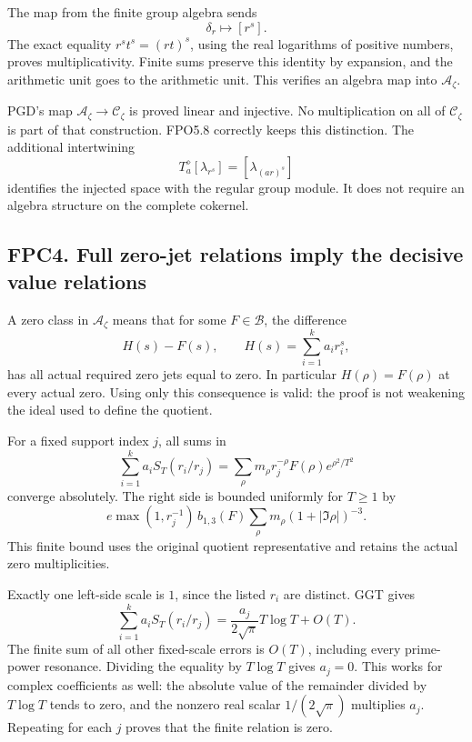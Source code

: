 The map from the finite group algebra sends \[
\delta_r\mapsto[r^s].
\] The exact equality \(r^st^s=(rt)^s\), using the real logarithms of
positive numbers, proves multiplicativity. Finite sums preserve this
identity by expansion, and the arithmetic unit goes to the arithmetic
unit. This verifies an algebra map into \(\mathcal A_\zeta\).

PGD's map \(\mathcal A_\zeta\to\mathcal C_\zeta\) is proved linear and
injective. No multiplication on all of \(\mathcal C_\zeta\) is part of
that construction. FPO5.8 correctly keeps this distinction. The
additional intertwining \[
T_a^\diamond[\lambda_{r^s}]=[\lambda_{(ar)^s}]
\] identifies the injected space with the regular group module. It does
not require an algebra structure on the complete cokernel.

\subsection{FPC4. Full zero-jet relations imply the decisive value
relations}\label{fpc4.-full-zero-jet-relations-imply-the-decisive-value-relations}

A zero class in \(\mathcal A_\zeta\) means that for some
\(F\in\mathcal B\), the difference \[
H(s)-F(s),\qquad H(s)=\sum_{i=1}^k a_i r_i^s,
\] has all actual required zero jets equal to zero. In particular
\(H(\rho)=F(\rho)\) at every actual zero. Using only this consequence is
valid: the proof is not weakening the ideal used to define the quotient.

For a fixed support index \(j\), all sums in \[
\sum_{i=1}^k a_i S_T(r_i/r_j)
=\sum_\rho m_\rho r_j^{-\rho}F(\rho)e^{\rho^2/T^2}
\] converge absolutely. The right side is bounded uniformly for
\(T\ge1\) by \[
e\max(1,r_j^{-1})\,b_{1,3}(F)
\sum_\rho m_\rho(1+|\Im\rho|)^{-3}.
\tag{FPC4.1}
\] This finite bound uses the original quotient representative and
retains the actual zero multiplicities.

Exactly one left-side scale is \(1\), since the listed \(r_i\) are
distinct. GGT gives \[
\sum_{i=1}^k a_i S_T(r_i/r_j)
=\frac{a_j}{2\sqrt\pi}T\log T+O(T).
\tag{FPC4.2}
\] The finite sum of all other fixed-scale errors is \(O(T)\), including
every prime-power resonance. Dividing the equality by \(T\log T\) gives
\(a_j=0\). This works for complex coefficients as well: the absolute
value of the remainder divided by \(T\log T\) tends to zero, and the
nonzero real scalar \(1/(2\sqrt\pi)\) multiplies \(a_j\). Repeating for
each \(j\) proves that the finite relation is zero.

